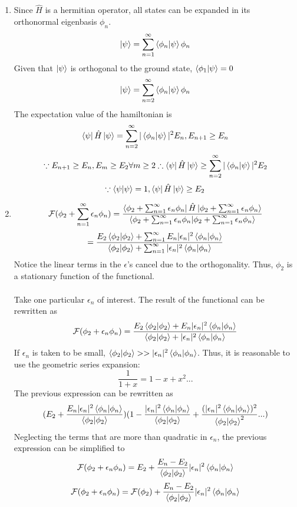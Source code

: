\begin{sol}
\begin{enumerate}[label=\textbf{(\alph*)}]
\item
Since $\hat{H}$ is a hermitian operator, all states can be expanded in its orthonormal eigenbasis $\phi_n$.\\
$$\ket\psi=\sum_{n=1}^\infty\braket{\phi_n}{\psi}\phi_n$$ 
Given that $\ket\psi$ is orthogonal to the ground state, $\braket{\phi_1}{\psi}=0$
$$\ket\psi=\sum_{n=2}^\infty\braket{\phi_n}{\psi}\phi_n$$ 
The expectation value of the hamiltonian is
$$\bra{\psi}\hat{H}\ket{\psi}=\sum_{n=2}^\infty|\braket{\phi_n}{\psi}|^2E_n, E_{n+1}\geq E_n$$
$$\because E_{n+1}\geq E_n, E_m\geq E_2\forall m\geq 2\therefore \bra{\psi}\hat{H}\ket{\psi}\geq\sum_{n=2}^\infty|\braket{\phi_n}{\psi}|^2 E_2$$
$$\because \braket{\psi}{\psi}=1, \bra\psi\hat H\ket\psi\geq E_2$$
\item
$$\mathcal{F}(\phi_2+\sum_{n=1}^\infty\epsilon_n\phi_n)=\frac{\bra{\phi_2+\sum_{n=1}^\infty\epsilon_n\phi_n}\hat H\ket{\phi_2+\sum_{n=1}^\infty\epsilon_n\phi_n}}{\braket{\phi_2+\sum_{n=1}^\infty\epsilon_n\phi_n}{\phi_2+\sum_{n=1}^\infty\epsilon_n\phi_n}}$$ $$=\frac{E_2\braket{\phi_2}{\phi_2}+\sum_{n=1}^\infty E_n|\epsilon_n|^2\braket{\phi_n}{\phi_n}}{\braket{\phi_2}{\phi_2}+\sum_{n=1}^\infty|\epsilon_n|^2\braket{\phi_n}{\phi_n}}$$
Notice the linear terms in the $\epsilon$'s cancel due to the orthogonality.  Thus, $\phi_2$ is a stationary function of the functional.\\
\\
Take one particular $\epsilon_n$ of interest. The result of the functional can be rewritten as
$$\mathcal{F}(\phi_2+\epsilon_n\phi_n)=\frac{E_2\braket{\phi_2}{\phi_2}+E_n|\epsilon_n|^2\braket{\phi_n}{\phi_n}}{\braket{\phi_2}{\phi_2}+|\epsilon_n|^2\braket{\phi_n}{\phi_n}}$$ If $\epsilon_n$ is taken to be small, $\braket{\phi_2}{\phi_2}>>|\epsilon_n|^2\braket{\phi_n}{\phi_n}$. Thus, it is reasonable to use the geometric series expansion:
$$\frac{1}{1+x}= 1-x+x^2...$$ The previous expression can be rewritten as
$$(E_2+\frac{E_n|\epsilon_n|^2\braket{\phi_n}{\phi_n}}{\braket{\phi_2}{\phi_2}})(1-\frac{|\epsilon_n|^2\braket{\phi_n}{\phi_n}}{\braket{\phi_2}{\phi_2}}+\frac{(|\epsilon_n|^2\braket{\phi_n}{\phi_n})^2}{\braket{\phi_2}{\phi_2}^2}...)$$ 
Neglecting the terms that are more than quadratic in $\epsilon_n$, the previous expression can be simplified to
$$\mathcal{F}(\phi_2+\epsilon_n\phi_n)=E_2+\frac{E_n-E_2}{\braket{\phi_2}{\phi_2}}|\epsilon_n|^2\braket{\phi_n}{\phi_n}$$
$$\mathcal{F}(\phi_2+\epsilon_n\phi_n)=\mathcal{F}(\phi_2)+\frac{E_n-E_2}{\braket{\phi_2}{\phi_2}}|\epsilon_n|^2\braket{\phi_n}{\phi_n}$$

\end{enumerate}
\end{sol}
